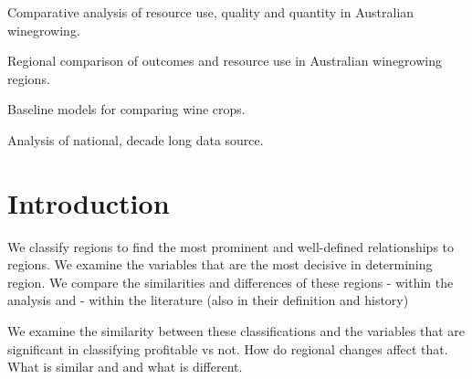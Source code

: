 \documentclass[review,12pt,authoryear]{elsarticle}
\begin{document}
\begin{linenumbers}
\begin{frontmatter}
\begin{highlights}
  \item Comparative analysis of resource use, quality and quantity in Australian winegrowing.
  \item Regional comparison of outcomes and resource use in Australian winegrowing regions.
  \item Baseline models for comparing wine crops.
  \item Analysis of national, decade long data source.
\end{highlights}
\end{frontmatter}


\section{Introduction}

%
%
%   
%


We classify regions to find the most prominent and well-defined relationships to regions.
We examine the variables that are the most decisive in determining region.
We compare the similarities and differences of these regions
- within the analysis and
- within the literature (also in their definition and history)

We examine the similarity between these classifications and the variables that are significant in classifying profitable vs not.
How do regional changes affect that. What is similar and and what is different.


\end{linenumbers}
\end{document}
